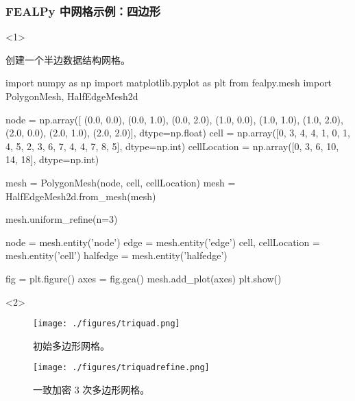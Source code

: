 \documentclass{beamer}
\numberwithin{subsection}{section}
\begin{document}
\begin{frame}[fragile]
    \frametitle{FEALPy 中网格示例：四边形}
\begin{onlyenv}<1>
	\begin{listing}[H]
	 \tiny
     \caption{创建一个半边数据结构网格。}
	 \begin{pythoncode}
import numpy as np
import matplotlib.pyplot as plt
from fealpy.mesh import PolygonMesh, HalfEdgeMesh2d 

node = np.array([
    (0.0, 0.0), (0.0, 1.0), (0.0, 2.0),
    (1.0, 0.0), (1.0, 1.0), (1.0, 2.0),
    (2.0, 0.0), (2.0, 1.0), (2.0, 2.0)], dtype=np.float)
cell = np.array([0, 3, 4, 4, 1, 0,
    1, 4, 5, 2, 3, 6, 7, 4, 4, 7, 8, 5], dtype=np.int)
cellLocation = np.array([0, 3, 6, 10, 14, 18], dtype=np.int)

mesh = PolygonMesh(node, cell, cellLocation)
mesh = HalfEdgeMesh2d.from_mesh(mesh)

mesh.uniform_refine(n=3)

node = mesh.entity('node')
edge = mesh.entity('edge')
cell, cellLocation = mesh.entity('cell')
halfedge = mesh.entity('halfedge')

fig = plt.figure()
axes = fig.gca()
mesh.add_plot(axes)
plt.show()
	 \end{pythoncode}     
	\end{listing}
\end{onlyenv}

\begin{onlyenv}<2>
\begin{figure}[H]
	\begin{minipage}[t]{0.49\linewidth}
	\centering
    \texttt{[image: ./figures/triquad.png]}
    \caption{初始多边形网格。}
	\end{minipage}
	\hfill
	\begin{minipage}[t]{0.49\linewidth}
	\centering
    \texttt{[image: ./figures/triquadrefine.png]}
    \caption{一致加密 3 次多边形网格。}
	\end{minipage}	
\end{figure}
\end{onlyenv}
\end{frame}
\end{document}
